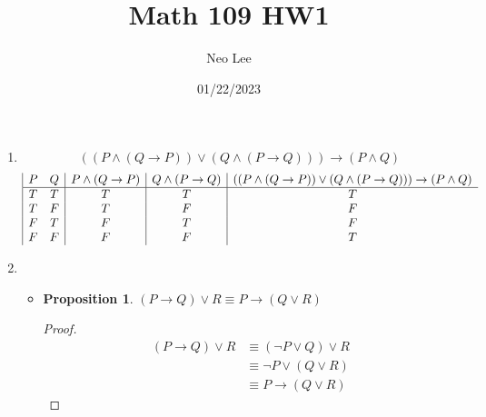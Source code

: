 \documentclass{article}
\title{Math 109 HW1}
\author{Neo Lee}
\date{01/22/2023}
\newtheorem{prop}[thm]{Proposition}
\begin{document}
 

\maketitle 

\begin{enumerate}[label={(\arabic*)}]
\item 
$$((P \wedge (Q \rightarrow P)) \vee (Q \wedge (P \rightarrow Q))) \rightarrow (P \wedge Q)$$
\begin{displaymath}
    \begin{array}{|c c|c|c|c}
    P & Q & P \wedge (Q \rightarrow P) & Q \wedge (P \rightarrow Q) & ((P \wedge (Q \rightarrow P)) \vee (Q \wedge (P \rightarrow Q))) \rightarrow (P \wedge Q)\\ %
    \hline  %
    T & T & T & T & T\\
    T & F & T & F & F\\
    F & T & F & T & F\\
    F & F & F & F & T\\
    \end{array}
\end{displaymath}

\item
\begin{itemize}
    \item 
    \begin{prop}
        $(P \rightarrow Q) \vee R \equiv P \rightarrow (Q \vee R)$
    \end{prop}
    \begin{proof}
        \begin{align}
            (P \rightarrow Q) \vee R & \equiv (\neg P \vee Q) \vee R \\
            & \equiv \neg P \vee (Q \vee R) \\
            & \equiv P \rightarrow (Q \vee R)
        \end{align}


\end{proof}
\end{itemize}
\end{enumerate}
\end{document}

